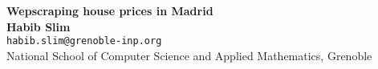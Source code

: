 \documentclass{article}
\begin{document}
	\begin{center}
    
		\LARGE{\textbf{Wepscraping house prices in Madrid}} \\
        \vspace{1em}
        \normalsize\textbf{Habib Slim} \\
        \normalsize\texttt{{habib.slim@grenoble-inp.org}} \\
        \vspace{1em}
        \normalsize{National School of Computer Science and Applied Mathematics, Grenoble} \\

        \vspace{1em}
        \renewcommand{\abstractname}{\large{Abstract}}

	\end{center}
\end{document}
